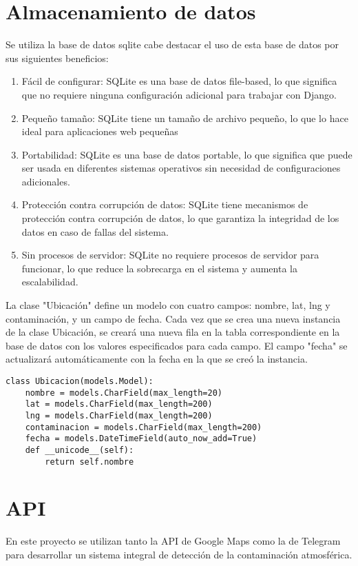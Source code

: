 \section{Almacenamiento de datos}
Se utiliza la base de datos sqlite cabe destacar el uso de esta base de datos por sus siguientes beneficios:
\begin{enumerate}
    \item Fácil de configurar: SQLite es una base de datos file-based, lo que significa que no requiere ninguna configuración adicional para trabajar con Django.
    \item Pequeño tamaño: SQLite tiene un tamaño de archivo pequeño, lo que lo hace ideal para aplicaciones web pequeñas
    \item Portabilidad: SQLite es una base de datos portable, lo que significa que puede ser usada en diferentes sistemas operativos sin necesidad de configuraciones adicionales.
    \item Protección contra corrupción de datos: SQLite tiene mecanismos de protección contra corrupción de datos, lo que garantiza la integridad de los datos en caso de fallas del sistema.
    \item Sin procesos de servidor: SQLite no requiere procesos de servidor para funcionar, lo que reduce la sobrecarga en el sistema y aumenta la escalabilidad.
\end{enumerate}

La clase "Ubicación" define un modelo con cuatro campos: nombre, lat, lng y contaminación, y un campo de fecha. Cada vez que se crea una nueva instancia de la clase Ubicación, se creará una nueva fila en la tabla correspondiente en la base de datos con los valores especificados para cada campo. El campo "fecha" se actualizará automáticamente con la fecha en la que se creó la instancia. 
\clearpage
\begin{lstlisting}[frame=single]
class Ubicacion(models.Model):
    nombre = models.CharField(max_length=20)
    lat = models.CharField(max_length=200)
    lng = models.CharField(max_length=200)
    contaminacion = models.CharField(max_length=200)
    fecha = models.DateTimeField(auto_now_add=True)
    def __unicode__(self):
        return self.nombre
\end{lstlisting}


\section{API}
En este proyecto se utilizan tanto la API de Google Maps como la de Telegram para desarrollar un sistema integral de detección de la contaminación atmosférica.

